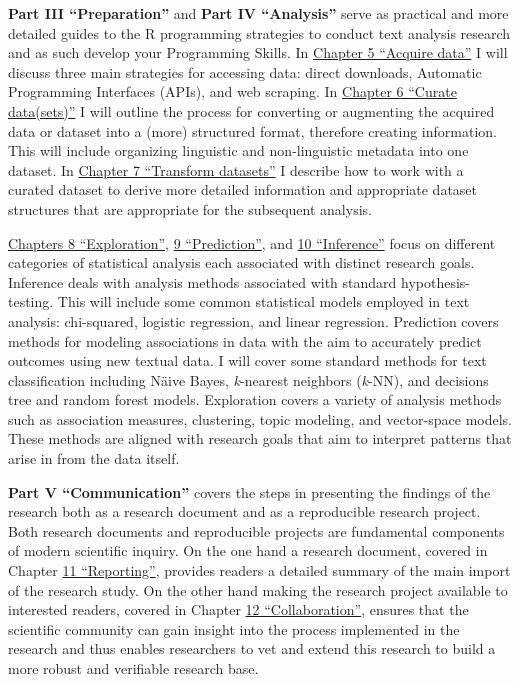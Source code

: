 \documentclass[
  letterpaper,
]{scrbook}
\begin{document}
\textbf{Part III ``Preparation''} and \textbf{Part IV ``Analysis''}
serve as practical and more detailed guides to the R programming
strategies to conduct text analysis research and as such develop your
Programming Skills. In \protect\hyperlink{sec-acquire-data}{Chapter 5
``Acquire data''} I will discuss three main strategies for accessing
data: direct downloads, Automatic Programming Interfaces (APIs), and web
scraping. In \protect\hyperlink{sec-curate-datasets}{Chapter 6 ``Curate
data(sets)''} I will outline the process for converting or augmenting
the acquired data or dataset into a (more) structured format, therefore
creating information. This will include organizing linguistic and
non-linguistic metadata into one dataset. In
\protect\hyperlink{sec-transform-datasets}{Chapter 7 ``Transform
datasets''} I describe how to work with a curated dataset to derive more
detailed information and appropriate dataset structures that are
appropriate for the subsequent analysis.

\protect\hyperlink{sec-exploration}{Chapters 8 ``Exploration''},
\protect\hyperlink{sec-prediction}{9 ``Prediction''}, and
\protect\hyperlink{sec-inference}{10 ``Inference''} focus on different
categories of statistical analysis each associated with distinct
research goals. Inference deals with analysis methods associated with
standard hypothesis-testing. This will include some common statistical
models employed in text analysis: chi-squared, logistic regression, and
linear regression. Prediction covers methods for modeling associations
in data with the aim to accurately predict outcomes using new textual
data. I will cover some standard methods for text classification
including Näive Bayes, \emph{k}-nearest neighbors (\emph{k}-NN), and
decisions tree and random forest models. Exploration covers a variety of
analysis methods such as association measures, clustering, topic
modeling, and vector-space models. These methods are aligned with
research goals that aim to interpret patterns that arise in from the
data itself.

\textbf{Part V ``Communication''} covers the steps in presenting the
findings of the research both as a research document and as a
reproducible research project. Both research documents and reproducible
projects are fundamental components of modern scientific inquiry. On the
one hand a research document, covered in Chapter
\protect\hyperlink{reporting-chapter}{11 ``Reporting''}, provides
readers a detailed summary of the main import of the research study. On
the other hand making the research project available to interested
readers, covered in Chapter \protect\hyperlink{collaboration-chapter}{12
``Collaboration''}, ensures that the scientific community can gain
insight into the process implemented in the research and thus enables
researchers to vet and extend this research to build a more robust and
verifiable research base.
\end{document}
